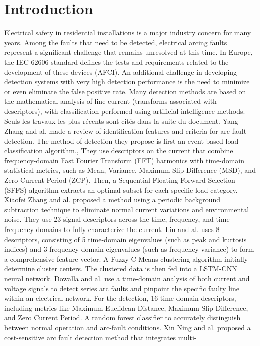 \documentclass[journal,article,submit,moreauthors]{Definitions/mdpi}
\begin{document}
\section{Introduction}

Electrical safety in residential installations is a major industry concern for many years.
Among the faults that need to be detected, electrical arcing faults represent a significant
challenge that remains unresolved at this time. In Europe, the IEC 62606 standard defines the
tests and requirements related to the development of these devices (AFCI). An additional
challenge in developing detection systems with very high detection performance is the need to
minimize or even eliminate the false positive rate.
Many detection methods are based on the mathematical analysis of line current (transforms
associated with descriptors), with classification performed using artificial intelligence
methods. Seuls les travaux les plus récents sont cités dans la suite du document.
Yang Zhang and al. made a review of identification features and criteria for arc fault
detection. The method of detection they propose is first an event-based load classification
algorithm., They use descriptors on the current that combine frequency-domain Fast Fourier
Transform (FFT) harmonics with time-domain statistical metrics, such as Mean, Variance,
Maximum Slip Difference (MSD), and Zero Current Period (ZCP). Then, a Sequential
Floating Forward Selection (SFFS) algorithm extracts an optimal subset for each specific load
category.
Xiaofei Zhang and al. proposed a method using a periodic background subtraction technique
to eliminate normal current variations and environmental noise. They use 23 signal
descriptors across the time, frequency, and time-frequency domains to fully characterize the
current.
Liu and al. uses 8 descriptors, consisting of 5 time-domain eigenvalues (such as peak and
kurtosis indices) and 3 frequency-domain eigenvalues (such as frequency variance) to form a
comprehensive feature vector. A Fuzzy C-Means clustering algorithm initially determine
cluster centers. The clustered data is then fed into a LSTM-CNN neural network.
Dowalla and al. use a time-domain analysis of both current and voltage signals to detect series
arc faults and pinpoint the specific faulty line within an electrical network. For the detection,
16 time-domain descriptors, including metrics like Maximum Euclidean Distance, Maximum
Slip Difference, and Zero Current Period. A random forest classifier to accurately distinguish
between normal operation and arc-fault conditions.
Xin Ning and al. proposed a cost-sensitive arc fault detection method that integrates multi-
\end{document}
